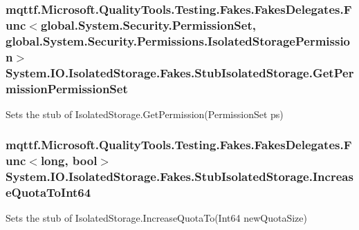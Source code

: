 \hypertarget{class_system_1_1_i_o_1_1_isolated_storage_1_1_fakes_1_1_stub_isolated_storage_a889a33a186b23ca8b266137b127138d4}{
\subsubsection[{Get\-Permission\-Permission\-Set}]{\setlength{\rightskip}{0pt plus 5cm}mqttf.\-Microsoft.\-Quality\-Tools.\-Testing.\-Fakes.\-Fakes\-Delegates.\-Func$<$global.\-System.\-Security.\-Permission\-Set, global.\-System.\-Security.\-Permissions.\-Isolated\-Storage\-Permission$>$ System.\-I\-O.\-Isolated\-Storage.\-Fakes.\-Stub\-Isolated\-Storage.\-Get\-Permission\-Permission\-Set}}\label{class_system_1_1_i_o_1_1_isolated_storage_1_1_fakes_1_1_stub_isolated_storage_a889a33a186b23ca8b266137b127138d4}


Sets the stub of Isolated\-Storage.\-Get\-Permission(\-Permission\-Set ps)

\hypertarget{class_system_1_1_i_o_1_1_isolated_storage_1_1_fakes_1_1_stub_isolated_storage_a36e9c3260161572a9d957cd2905ff209}{
\subsubsection[{Increase\-Quota\-To\-Int64}]{\setlength{\rightskip}{0pt plus 5cm}mqttf.\-Microsoft.\-Quality\-Tools.\-Testing.\-Fakes.\-Fakes\-Delegates.\-Func$<$long, bool$>$ System.\-I\-O.\-Isolated\-Storage.\-Fakes.\-Stub\-Isolated\-Storage.\-Increase\-Quota\-To\-Int64}}\label{class_system_1_1_i_o_1_1_isolated_storage_1_1_fakes_1_1_stub_isolated_storage_a36e9c3260161572a9d957cd2905ff209}


Sets the stub of Isolated\-Storage.\-Increase\-Quota\-To(\-Int64 new\-Quota\-Size)

